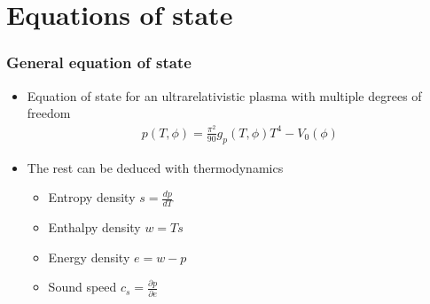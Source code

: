 \section{Equations of state}

\begin{frame}
    \frametitle{General equation of state}
    \begin{itemize}
        \item Equation of state for an ultrarelativistic plasma with multiple degrees of freedom
        \begin{align}
            p(T,\phi) = \frac{\pi^2}{90} g_p(T,\phi) T^4 - V_0(\phi)
        \end{align}
        \item The rest can be deduced with thermodynamics
        \begin{itemize}
            \item Entropy density $s = \frac{dp}{dT}$
            \item Enthalpy density $w = Ts$
            \item Energy density $e = w - p$
            \item Sound speed $c_s = \frac{\partial p}{\partial e}$
        \end{itemize}
    \end{itemize}
\end{frame}

